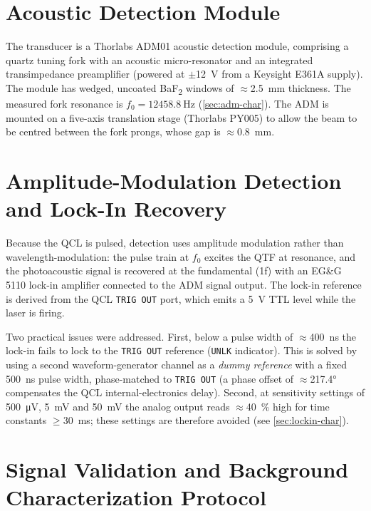 \section{Acoustic Detection Module}
\label{sec:adm}

The transducer is a Thorlabs ADM01 acoustic detection module, comprising a
quartz tuning fork with an acoustic micro-resonator and an integrated
transimpedance preamplifier (powered at \(\pm\)\SI{12}{\volt} from a Keysight
E361A supply). The module has wedged, uncoated BaF\textsubscript{2} windows of
\(\approx\)\SI{2.5}{\milli\meter} thickness. The measured fork resonance is
$f_0 = \SI{12458.8}{\hertz}$ (\cref{sec:adm-char}). The ADM is mounted on a
five-axis translation stage (Thorlabs PY005) to allow the beam to be centred
between the fork prongs, whose gap is \(\approx\)\SI{0.8}{\milli\meter}.

\section{Amplitude-Modulation Detection and Lock-In Recovery}
\label{sec:am-scheme}

Because the QCL is pulsed, detection uses amplitude modulation rather than
wavelength-modulation: the pulse train at $f_0$ excites the QTF at resonance, and
the photoacoustic signal is recovered at the fundamental (1f) with an EG\&G 5110
lock-in amplifier connected to the ADM signal output. The lock-in reference is
derived from the QCL \texttt{TRIG OUT} port, which emits a \SI{5}{\volt} TTL
level while the laser is firing.

Two practical issues were addressed. First, below a pulse width of
\(\approx\)\SI{400}{\nano\second} the lock-in fails to lock to the
\texttt{TRIG OUT} reference (\texttt{UNLK} indicator). This is solved by using a
second waveform-generator channel as a \emph{dummy reference} with a fixed
\SI{500}{\nano\second} pulse width, phase-matched to \texttt{TRIG OUT} (a phase
offset of \(\approx\)\ang{217.4} compensates the QCL internal-electronics delay).
Second, at sensitivity settings of \SI{500}{\micro\volt}, \SI{5}{\milli\volt} and
\SI{50}{\milli\volt} the analog output reads \(\approx\)\SI{40}{\percent} high
for time constants \(\ge\)\SI{30}{\milli\second}; these settings are therefore
avoided (see \cref{sec:lockin-char}).

\section{Signal Validation and Background Characterization Protocol}
\label{sec:validation-protocol}

